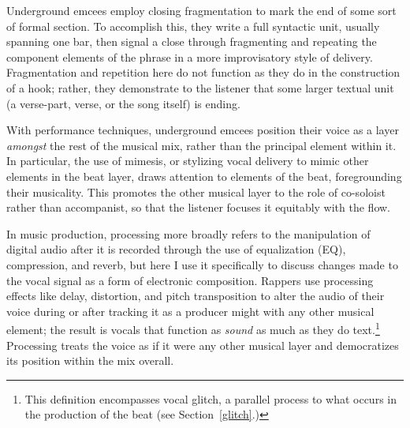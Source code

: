 Underground emcees employ closing fragmentation to mark the end of some sort of formal section. To
accomplish this, they write a full syntactic unit, usually spanning one bar, then signal a close 
through fragmenting and repeating the component elements of the phrase in a more improvisatory style
of delivery. Fragmentation and repetition here do not function as they do in the construction of a 
hook; rather, they demonstrate to the listener that some larger textual unit (a verse-part, verse,
or the song itself) is ending.

With performance techniques, underground emcees position their voice as a layer \emph{amongst} the rest
of the musical mix, rather than the principal element within it. In particular, the use of mimesis, or
stylizing vocal delivery to mimic other elements in the beat layer, draws attention to elements of the
beat, foregrounding their musicality. This promotes the other musical layer to the role of co-soloist
rather than accompanist, so that the listener focuses it equitably with the flow.

In music production, processing more broadly refers to the manipulation of digital audio after it is 
recorded through the use of equalization (EQ), compression, and reverb, but here I use it specifically
to discuss changes made to the vocal signal as a form of electronic composition. Rappers use processing
effects like delay, distortion, and pitch transposition to alter the audio of their voice during or after
tracking it as a producer might with any other musical element; the result is vocals that function as 
\emph{sound} as much as they do text.\footnote{
    This definition encompasses vocal glitch, a parallel process to what occurs in the production of 
    the beat (see Section~\ref{glitch}.)}
Processing treats the voice as if it were any other musical layer and democratizes its position within
the mix overall.


